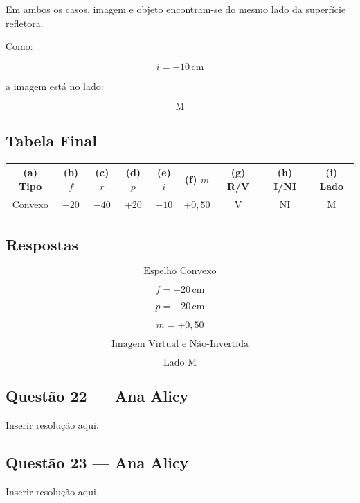 \documentclass[12pt,a4paper]{article}
\begin{document}
Em ambos os casos, imagem e objeto encontram-se do mesmo lado da superfície refletora.

Como:

\[
i = -10\,\text{cm}
\]

a imagem está no lado:

\[
\boxed{\text{M}}
\]


\subsection*{Tabela Final}

\begin{center}
\begin{tabular}{ccccccccc}
\hline

(a) Tipo & (b) $f$ & (c) $r$ & (d) $p$ & (e) $i$
& (f) $m$ & (g) R/V & (h) I/NI & (i) Lado \\

\hline

Convexo & $-20$ & $-40$ & $+20$ & $-10$
& $+0,50$ & V & NI & M \\

\hline
\end{tabular}
\end{center}


\subsection*{Respostas}

\[
\boxed{
\text{Espelho Convexo}
}
\]

\[
\boxed{
f = -20\,\text{cm}
}
\]

\[
\boxed{
p = +20\,\text{cm}
}
\]

\[
\boxed{
m = +0,50
}
\]

\[
\boxed{
\text{Imagem Virtual e Não-Invertida}
}
\]

\[
\boxed{
\text{Lado M}
}
\]

\subsection{Questão 22 — Ana Alicy}
Inserir resolução aqui.

\subsection{Questão 23 — Ana Alicy}
Inserir resolução aqui.
\end{document}
